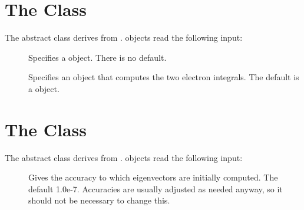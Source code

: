 

\section{The  Class}
\label{Wavefunction}

The  abstract class derives from
.   objects read the
following input:

\begin{description}
  \item[] Specifies a  object.
    There is no default.

  \item[] Specifies an  object that
    computes the two electron integrals.  The default is a
     object.

\end{description}


\section{The  Class}
\label{OneBodyWavefunction}

The  abstract class derives from
.   objects read the
following input:

\begin{description}
  \item[] Gives the accuracy to which
    eigenvectors are initially computed.  The default 1.0e-7.  Accuracies
    are usually adjusted as needed anyway, so it should not be necessary to
    change this.

\end{description}
